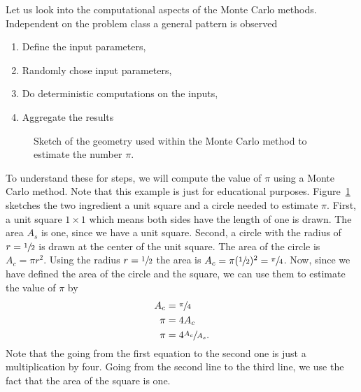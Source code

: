\documentclass[11pt,fleqn]{book} %
\begin{document}
Let us look into the computational aspects of the Monte Carlo methods. Independent on the problem class a general pattern is observed
\begin{enumerate}
\item Define the input parameters,
\item Randomly chose input parameters,
\item Do deterministic computations on the inputs,
\item Aggregate the results
\end{enumerate}

\begin{figure}[h]
  \begin{center}
  \end{center}
  \caption{Sketch of the geometry used within the Monte Carlo method to estimate the number $\pi$.}
  \label{fig:monte}
\end{figure}
To understand these for steps, we will compute the value of $\pi$ using a Monte Carlo method. Note that this example is just for educational purposes. Figure~\ref{fig:monte} sketches the two ingredient a unit square and a circle needed to estimate $\pi$. First, a unit square $1 \times 1$ which means both sides have the length of one is drawn. The area $A_s$ is one, since we have a unit square. Second, a circle with the radius of $r=\sfrac{1}{2}$ is drawn at the center of the unit square. The area of the circle is $A_c=\pi r^2$. Using the radius $r=\sfrac{1}{2}$ the area is $A_c=\pi(\sfrac{1}{2})^2=\sfrac{\pi}{4}$. Now, since we have defined the area of the circle and the square, we can use them to estimate the value of $\pi$ by
\begin{align}
A_c &= \sfrac{\pi}{4} \notag\\
\pi &= 4 A_c \notag\\
\pi &= 4 \sfrac{A_c}{A_s}\text{.}
\end{align}
Note that the going from the first equation to the second one is just a multiplication by four. Going from the second line to the third line, we use the fact that the area of the square is one. \\
\end{document}
